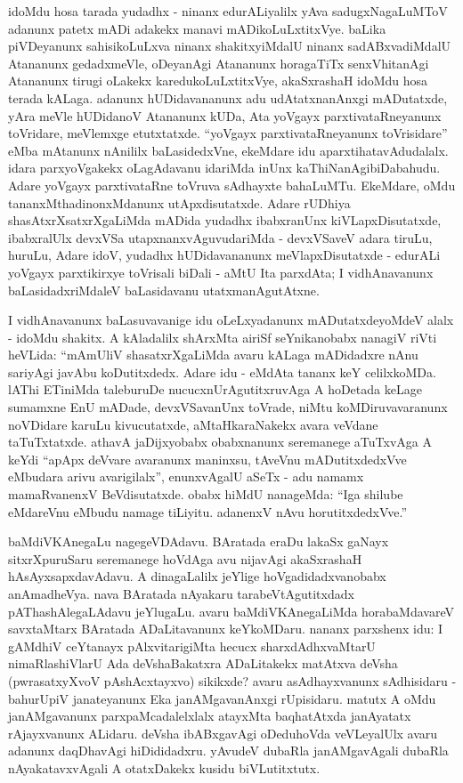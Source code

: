 idoMdu hosa tarada yudadhx - ninanx edurALiyalilx yAva sadugxNa\-gaLuMToV adanunx patetx mADi adakekx manavi mADikoLuLxtitxVye. baLika piVDeyanunx sahisikoLuLxva ninanx shakitxyiMdalU ninanx sadABxvadiMdalU Atananunx gedadxmeVle, oDeyanAgi Atananunx horagaTiTx senxVhitanAgi Atananunx tirugi oLakekx karedukoLuLxtitxVye, akaSxrashaH idoMdu hosa terada kALaga. adanunx hUDidavananunx adu udAtatxnanAnxgi mADutatxde, yAra meVle hUDidanoV Atananunx kUDa, Ata yoVgayx parxtivataRneyanunx toVridare, meVlemxge etutxtatxde. ``yoVgayx parxtivataRneyanunx toVrisidare'' eMba mAtanunx nAnililx baLasidedxVne, ekeMdare idu aparxtihatavAdudalalx. idara parxyoVgakekx oLagAdavanu idariMda inUnx kaThiNanAgibiDabahudu. Adare yoVgayx parxtivataRne toVruva sAdhayxte bahaLuMTu. EkeMdare, oMdu tananxMthadinonxMdanunx utApxdisutatxde. Adare rUDhiya shasAtxrXsatxrXgaLiMda mADida yudadhx ibabxranUnx kiVLapxDisutatxde, ibabxralUlx devxVSa utapxnanxvAguvudariMda - devxVSaveV adara tiruLu, huruLu, Adare idoV, yudadhx hUDidavananunx meVlapxDisutatxde - edurALi yoVgayx parxtikirxye toVrisali biDali - aMtU Ita parxdAta; I vidhAnavanunx baLasidadxriMdaleV baLasidavanu utatxmanAgutAtxne.

I vidhAnavanunx baLasuvavanige idu oLeLxyadanunx mADutatxdeyoMdeV alalx - idoMdu shakitx. A kAladalilx shArxMta airiSf seYnikanobabx nanagiV riVti heVLida: ``mAmUliV shasatxrXgaLiMda avaru kALaga mADidadxre nAnu sariyAgi javAbu koDutitxdedx. Adare idu - eMdAta tananx keY celilxkoMDa. lAThi ETiniMda taleburuDe nucucxnUrAgutitxruvAga A hoDetada keLage sumamxne EnU mADade, devxVSavanUnx toVrade, niMtu koMDiruvavaranunx noVDidare karuLu kivucutatxde, aMtaHkaraNakekx avara veVdane taTuTxtatxde. athavA jaDijxyobabx obabxnanunx seremanege aTuTxvAga A keYdi ``apApx deVvare avaranunx maninxsu, tAveVnu mADutitxdedxVve eMbudara arivu avarigilalx'', enunxvAgalU aSeTx - adu namamx mamaRvanenxV BeVdisutatxde. obabx hiMdU nanageMda: ``Iga shilube eMdareVnu eMbudu namage tiLiyitu. adanenxV nAvu horutitxdedxVve.''

baMdiVKAnegaLu nagegeVDAdavu. BAratada eraDu lakaSx gaNayx sitxrXpuruSaru seremanege hoVdAga avu nijavAgi akaSxrashaH hAsAyxsapxdavAdavu. A dinagaLalilx jeYlige hoVgadidadxvanobabx anAmadheVya. nava BAratada nAyakaru tarabeVtAgutitxdadx pAThashAlegaLAdavu jeYlugaLu. avaru baMdiVKAnegaLiMda horabaMdavareV savxtaMtarx BAratada ADaLitavanunx keYkoMDaru. nananx parxshenx idu: I gAMdhiV ceYtanayx pAlxvitarigiMta hecucx sharxdAdhxvaMtarU nimaRlashiVlarU Ada deVshaBakatxra ADaLitakekx matAtxva deVsha (pwrasatxyXvoV pAshAcxtayxvo) sikikxde? avaru asAdhayxvanunx sAdhisidaru - bahurUpiV janateyanunx Eka janAMgavanAnxgi rUpisidaru. matutx A oMdu janAMgavanunx parxpaMcadalelxlalx atayxMta baqhatAtxda janAyatatx rAjayxvanunx ALidaru. deVsha ibABxgavAgi oDeduhoVda veVLeyalUlx avaru adanunx daqDhavAgi hiDididadxru. yAvudeV dubaRla janAMgavAgali dubaRla nAyakatavxvAgali A otatxDakekx kusidu biVLutitxtutx. 

